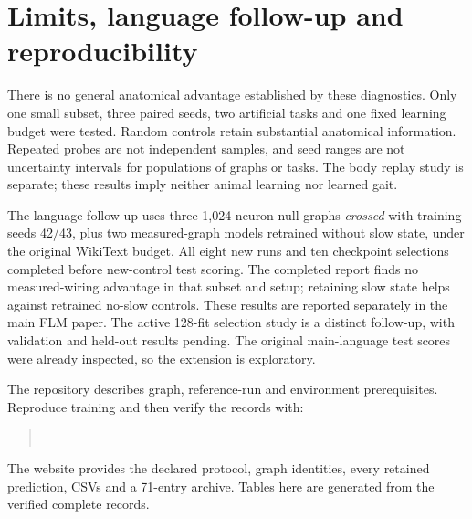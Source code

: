 \documentclass[10pt]{article}
\begin{document}
\section{Limits, language follow-up and reproducibility}
There is no general anatomical advantage established by these diagnostics.
Only one small subset, three paired seeds, two artificial tasks and one fixed
learning budget were tested. Random controls retain substantial anatomical
information. Repeated probes are not independent samples, and seed ranges are
not uncertainty intervals for populations of graphs or tasks. The body replay
study is separate; these results imply neither animal learning nor learned gait.

The language follow-up uses three 1,024-neuron null graphs \emph{crossed} with
training seeds 42/43, plus two measured-graph models retrained without slow
state, under the original WikiText budget. All eight new runs and ten checkpoint selections completed before
new-control test scoring. The completed report finds no measured-wiring
advantage in that subset and setup; retaining slow state helps against
retrained no-slow controls. These results are reported separately in the
main FLM paper. The active 128-fit selection study is a distinct follow-up,
with validation and held-out results pending. The original main-language test scores were already
inspected, so the extension is exploratory.

The repository describes graph, reference-run and environment prerequisites.
Reproduce training and then verify the records with:
\begin{quote}\\
\end{quote}
The website provides the declared protocol, graph identities, every retained
prediction, CSVs and a 71-entry archive. Tables here are generated from the
verified complete records.

\begingroup\footnotesize

\endgroup
\end{document}
